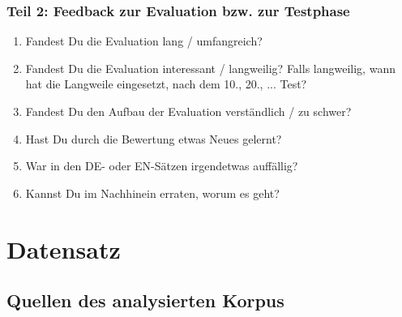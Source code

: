 \subsection*{Teil 2: Feedback zur Evaluation bzw. zur Testphase}


\begin{enumerate}
\item Fandest Du die Evaluation lang / umfangreich?
\item Fandest Du die Evaluation interessant / langweilig? Falls langweilig, wann hat die Langweile eingesetzt, nach dem 10., 20., ... Test?
\item Fandest Du den Aufbau der Evaluation verständlich / zu schwer?
\item Hast Du durch die Bewertung etwas Neues gelernt?
\item War in den DE- oder EN-Sätzen irgendetwas auffällig?
\item Kannst Du im Nachhinein erraten, worum es geht?
 \end{enumerate}


\chapter{Datensatz}\label{app:3}

\section*{Quellen des analysierten Korpus}


